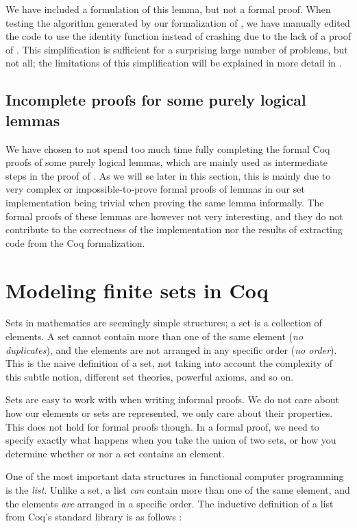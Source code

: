 We have included a formulation of this lemma, but not a formal proof.
When testing the algorithm generated by our formalization of ,
we have manually edited the code to use the identity function instead of crashing due to
the lack of a proof of .
This simplification is sufficient for a surprising large number of problems, but not all;
the limitations of this simplification will be explained in more detail in .

\subsection{Incomplete proofs for some purely logical lemmas}
\label{ssec:incomplete_proofs_for_some_purely_logical_lemmas}

We have chosen to not spend too much time fully completing the formal Coq proofs of some purely logical lemmas,
which are mainly used as intermediate steps in the proof of .
As we will se later in this section, this is mainly due to
very complex or impossible-to-prove formal proofs of lemmas in our set implementation
being trivial when proving the same lemma informally.
The formal proofs of these lemmas are however not very interesting,
and they do not contribute to the correctness of the implementation nor
the results of extracting code from the Coq formalization.

\section{Modeling finite sets in Coq}
\label{sec:modeling_finite_sets_in_coq}

Sets in mathematics are seemingly simple structures; a set is a collection of elements.
A set cannot contain more than one of the same element (\textit{no duplicates}), and the elements are not arranged in any
specific order (\textit{no order}).
This is the naive definition of a set, not taking into account the complexity of this subtle notion,
different set theories, powerful axioms, and so on.

Sets are easy to work with when writing informal proofs.
We do not care about how our elements or sets are represented, we only care about their properties.
This does not hold for formal proofs though. In a formal proof, we need to specify exactly what happens
when you take the union of two sets, or how you determine whether or nor a set contains an element.

One of the most important data structures in functional computer programming is the \textit{list}.
Unlike a set, a list \textit{can} contain more than one of the same element, and the elements \textit{are} arranged in a
specific order.
The inductive definition of a list from Coq's standard library is as follows \cite{coqdatatypes}:


